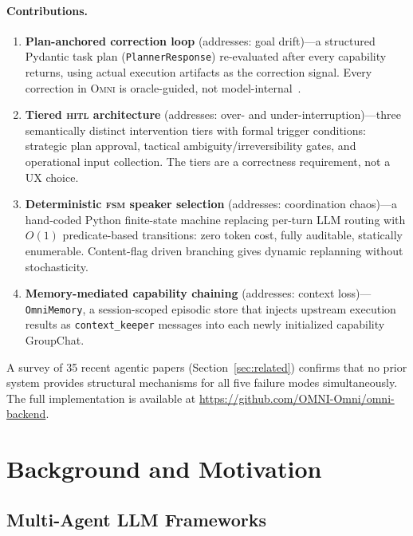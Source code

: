 \documentclass[11pt,a4paper]{article}
\newcommand{\omni}{\textsc{Omni}}
\newcommand{\hitl}{\textsc{hitl}}
\newcommand{\fsm}{\textsc{fsm}}
\begin{document}
\paragraph{Contributions.}
\begin{enumerate}[leftmargin=*, topsep=2pt, itemsep=1pt]
  \item \textbf{Plan-anchored correction loop} (addresses: goal drift)---a structured Pydantic task plan (\texttt{PlannerResponse}) re-evaluated after every capability returns, using actual execution artifacts as the correction signal. Every correction in \omni{} is oracle-guided, not model-internal~\cite{huang2024llms}.
  \item \textbf{Tiered \hitl{} architecture} (addresses: over- and under-interruption)---three semantically distinct intervention tiers with formal trigger conditions: strategic plan approval, tactical ambiguity/irreversibility gates, and operational input collection. The tiers are a correctness requirement, not a UX choice.
  \item \textbf{Deterministic \fsm{} speaker selection} (addresses: coordination chaos)---a hand-coded Python finite-state machine replacing per-turn LLM routing with $O(1)$ predicate-based transitions: zero token cost, fully auditable, statically enumerable. Content-flag driven branching gives dynamic replanning without stochasticity.
  \item \textbf{Memory-mediated capability chaining} (addresses: context loss)---\texttt{OmniMemory}, a session-scoped episodic store that injects upstream execution results as \texttt{context\_keeper} messages into each newly initialized capability GroupChat.
\end{enumerate}

A survey of 35 recent agentic papers (Section~\ref{sec:related}) confirms that no prior system provides structural mechanisms for all five failure modes simultaneously. The full implementation is available at \url{https://github.com/OMNI-Omni/omni-backend}.

\section{Background and Motivation}
\label{sec:background}

\subsection{Multi-Agent LLM Frameworks}
\end{document}
